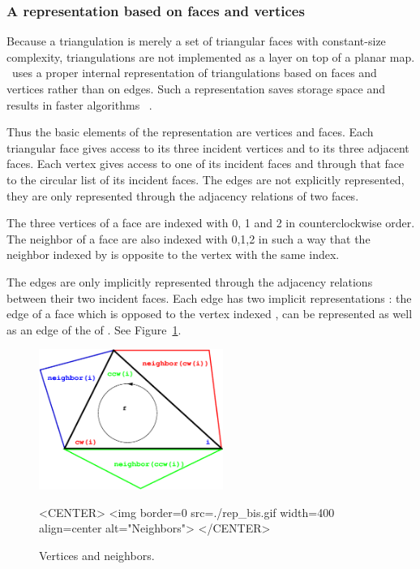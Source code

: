 \subsubsection{ A representation based on faces and vertices}
Because a triangulation is merely a set of
triangular faces with constant-size complexity,
triangulations are not implemented
as a layer on top of a planar map.
\cgal\ uses a proper internal
representation of triangulations based on faces and vertices
rather than on edges. Such a  representation
saves storage space and results in faster
algorithms~ \cite{bdty-tcgal-00}.

Thus the basic elements of the representation are vertices and faces.
Each triangular face gives access to its three incident vertices 
and to its three adjacent faces. 
Each vertex gives access to one of its incident faces
and through that face to the circular list of its incident faces.
The edges are not explicitly represented, they are only represented 
through the adjacency relations of two faces.

The three vertices of a face are indexed with 0, 1 and 2
in counterclockwise order. The neighbor of a face are also 
indexed with 0,1,2 in such a way that the neighbor indexed by 
is opposite to the vertex with the same index.

The edges  are only implicitly represented
through the adjacency relations between their  two incident
faces. Each edge has two implicit representations : the edge
of a face   which is opposed to the vertex indexed ,
can be represented as well as an edge of the  of 
. See Figure~\ref{I1_Fig_neighbors1}.

 \begin{figure}
\begin{ccTexOnly}
    \begin{center}
     \includegraphics[width=6cm]{rep_bis.eps} 
    \end{center}
\end{ccTexOnly} 
    \caption{Vertices and neighbors.
    \label{I1_Fig_neighbors1}}
  \begin{ccHtmlOnly}
<CENTER>
<img border=0  src=./rep_bis.gif width=400 align=center alt="Neighbors">
</CENTER>
\end{ccHtmlOnly} 
\end{figure}


